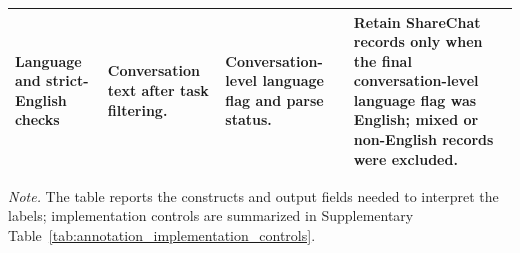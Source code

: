 \begin{table}[!htbp]
\begin{tabularx}{\textwidth}{>{\raggedright\arraybackslash}p{}>{\raggedright\arraybackslash}p{}>{\raggedright\arraybackslash}p{}>{\raggedright\arraybackslash}X}
\addlinespace
Language and strict-English checks & Conversation text after task filtering. & Conversation-level language flag and parse status. & Retain ShareChat records only when the final conversation-level language flag was English; mixed or non-English records were excluded. \\
\bottomrule
\end{tabularx}
\vspace{2pt}
\begin{minipage}{0.98\textwidth}
\footnotesize \textit{Note.} The table reports the constructs and output fields needed to interpret the labels; implementation controls are summarized in Supplementary Table~\ref{tab:annotation_implementation_controls}.
\end{minipage}
\end{table}
